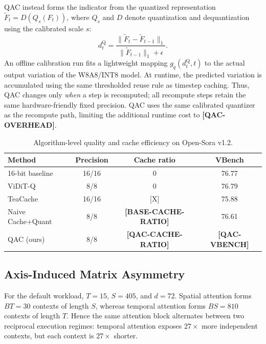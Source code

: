 \documentclass[conference]{IEEEtran}
\newcommand{\ModelName}{Open-Sora v1.2}
\newcommand{\BaselineVBench}{76.77}
\newcommand{\QuantOnlyVBench}{76.79}
\newcommand{\TeaCacheVBench}{75.88}
\newcommand{\NaiveCQVBench}{76.61}
\newcommand{\QACVBench}{\textbf{[QAC-VBENCH]}}
\newcommand{\SpatialSeq}{405}
\newcommand{\TemporalSeq}{15}
\newcommand{\SpatialContexts}{30}
\newcommand{\TemporalContexts}{810}
\newcommand{\BaseCacheRatio}{\textbf{[BASE-CACHE-RATIO]}}
\newcommand{\QACCacheRatio}{\textbf{[QAC-CACHE-RATIO]}}
\newcommand{\QACOverhead}{\textbf{[QAC-OVERHEAD]}}
\begin{document}
QAC instead forms the indicator from the quantized representation
$\widetilde F_t=D(Q_s(F_t))$, where $Q_s$ and $D$ denote quantization and
dequantization using the calibrated scale $s$:
\begin{equation}
d_t^{\mathrm{Q}}=
\frac{\lVert \widetilde F_t-\widetilde F_{t-1}\rVert_1}
     {\lVert \widetilde F_{t-1}\rVert_1+\epsilon}.
\label{eq:q_indicator}
\end{equation}
An offline calibration run fits a lightweight mapping
$g_q(d_t^{\mathrm{Q}},t)$ to the actual output variation of the W8A8/INT8
model. At runtime, the predicted variation is accumulated using the same
thresholded reuse rule as timestep caching. Thus, QAC changes only
\emph{when} a step is recomputed; all recompute steps retain the same
hardware-friendly fixed precision. QAC uses the same calibrated quantizer as the recompute path, limiting the
additional runtime cost to \QACOverhead{}.

\begin{table}[t]
\centering
\caption{Algorithm-level quality and cache efficiency on \ModelName{}.}
\label{tab:quality}
\setlength{\tabcolsep}{3.0pt}
\begin{tabular}{lccc}
\toprule
Method & Precision & Cache ratio & VBench \\
\midrule
16-bit baseline & 16/16 & 0 & \BaselineVBench \\
ViDiT-Q~\cite{zhao2025viditq} & 8/8 & 0 & \QuantOnlyVBench \\
TeaCache~\cite{liu2025teacache} & 16/16 & [X] & \TeaCacheVBench \\
Naive Cache+Quant & 8/8 & \BaseCacheRatio & \NaiveCQVBench \\
QAC (ours) & 8/8 & \QACCacheRatio & \QACVBench \\
\bottomrule
\end{tabular}
\end{table}

\subsection{Axis-Induced Matrix Asymmetry}
\label{sec:axis_asym}

For the default workload, $T=\TemporalSeq{}$, $S=\SpatialSeq{}$, and
$d=72$. Spatial attention forms $BT=\SpatialContexts{}$ contexts of length
$S$, whereas temporal attention forms $BS=\TemporalContexts{}$ contexts of
length $T$. Hence the same attention block alternates between two reciprocal
execution regimes: temporal attention exposes $27\times$ more independent
contexts, but each context is $27\times$ shorter.
\end{document}
